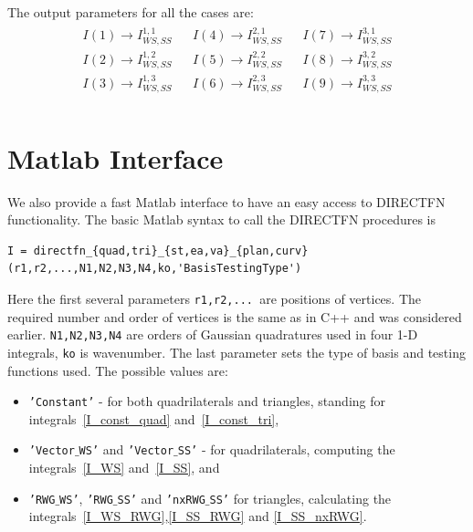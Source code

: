 \documentclass[a4wide,11pt]{article}
\renewcommand{\[}{\begin{equation}}
\renewcommand{\]}{\end{equation}}
\renewcommand{\{}{\begin{eqnarray}}
\renewcommand{\}}{\end{eqnarray}}
\begin{document}
The output parameters for all the cases are:
\[
\label{tri16}
\begin{matrix}
\begin{aligned}
I(1) \rightarrow I_{WS,SS}^{1,1}\\
I(2) \rightarrow I_{WS,SS}^{1,2}\\
I(3) \rightarrow I_{WS,SS}^{1,3}\\
\end{aligned}
&
\begin{aligned}
I(4) \rightarrow I_{WS,SS}^{2,1}\\
I(5) \rightarrow I_{WS,SS}^{2,2}\\
I(6) \rightarrow I_{WS,SS}^{2,3}\\
\end{aligned}
&
\begin{aligned}
I(7) \rightarrow I_{WS,SS}^{3,1}\\
I(8) \rightarrow I_{WS,SS}^{3,2}\\
I(9) \rightarrow I_{WS,SS}^{3,3}\\
\end{aligned}
\end{matrix}
\]

\section{Matlab Interface}
\label{matlab}
We also provide a fast Matlab interface to have an easy access to DIRECTFN functionality.
The basic Matlab syntax to call the DIRECTFN procedures is
\begin{verbatim}
I = directfn_{quad,tri}_{st,ea,va}_{plan,curv}(r1,r2,...,N1,N2,N3,N4,ko,'BasisTestingType')
\end{verbatim}
Here the first several parameters \texttt{r1,r2,... }are positions of vertices. The required number and order of vertices is the same as in C++ and was considered earlier.
\texttt{N1,N2,N3,N4} are orders of Gaussian quadratures used in four 1-D integrals, \texttt{ko} is wavenumber.
The last parameter sets the type of basis and testing functions used. The possible values are:
\begin{itemize}
	\item \texttt{'Constant'} - for both quadrilaterals and triangles, standing for integrals~\eqref{I_const_quad} and~\eqref{I_const_tri},
	\item \texttt{'Vector$\_$WS'} and \texttt{'Vector$\_$SS'} - for quadrilaterals, computing the integrals~\eqref{I_WS} and~\eqref{I_SS}, and
	\item \texttt{'RWG$\_$WS'}, \texttt{'RWG$\_$SS'} and \texttt{'nxRWG$\_$SS'} for triangles, calculating the integrals~\eqref{I_WS_RWG},\eqref{I_SS_RWG}
 and \eqref{I_SS_nxRWG}.
\end{itemize} 
\end{document}
